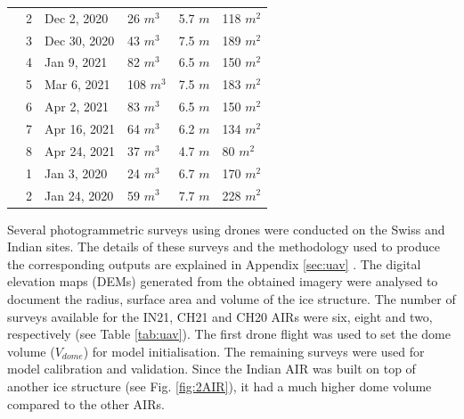 \documentclass[utf8]{frontiersSCNS}
\begin{document}
\begin{table}
\begin{tabular}{@{}|llllll|@{}}
		\multicolumn{1}{|l|}{} & 2            & Dec 2, 2020   & 26 $m^{3}$      & 5.7 $m$
		                       & 118 $m^{2}$                                                                       \\
		\multicolumn{1}{|l|}{} & 3            & Dec 30, 2020  & 43 $m^{3}$      & 7.5 $m$
		                       & 189 $m^{2}$                                                                       \\
		\multicolumn{1}{|l|}{} & 4            & Jan 9, 2021   & 82 $m^{3}$      & 6.5 $m$
		                       & 150 $m^{2}$                                                                       \\
		\multicolumn{1}{|l|}{} & 5            & Mar 6, 2021   & 108 $m^{3}$     & 7.5 $m$
		                       & 183 $m^{2}$                                                                       \\
		\multicolumn{1}{|l|}{} & 6            & Apr 2, 2021   & 83 $m^{3}$      & 6.5 $m$
		                       & 150 $m^{2}$                                                                       \\
		\multicolumn{1}{|l|}{} & 7            & Apr 16, 2021  & 64 $m^{3}$      & 6.2 $m$
		                       & 134 $m^{2}$                                                                       \\
		\multicolumn{1}{|l|}{} & 8            & Apr 24, 2021  & 37 $m^{3}$      & 4.7 $m$
		                       & 80 $m^{2}$                                                                       \\
		\midrule
		\multicolumn{1}{|l|}{\multirow{2}{*}{\rotatebox[origin=c]{90}{CH20}}}
		                       & 1            & Jan 3, 2020   & 24 $m^{3}$      & 6.7 $m$
		                       & 170 $m^{2}$                                                                      \\
		\multicolumn{1}{|l|}{} & 2            & Jan 24, 2020  & 59 $m^{3}$      & 7.7 $m$
		                       & 228 $m^{2}$                                                                      \\
		\midrule
	\end{tabular}

\end{table}

Several photogrammetric surveys using drones were conducted on the Swiss and Indian sites. The details of these
surveys and the methodology used to produce the corresponding outputs are explained in Appendix \ref{sec:uav} .
The digital elevation maps (DEMs) generated from the obtained imagery were analysed to document the radius,
surface area and volume of the ice structure. The number of surveys available for the IN21, CH21 and CH20 AIRs
were six, eight and two, respectively (see Table \ref{tab:uav}). The first drone flight was used to set the dome volume
($V_{dome}$) for model initialisation. The remaining surveys were used for model calibration and validation.
Since the Indian AIR was built on top of another ice structure (see Fig. \ref{fig:2AIR}), it had a much higher
dome volume compared to the other AIRs.  
\end{document}
